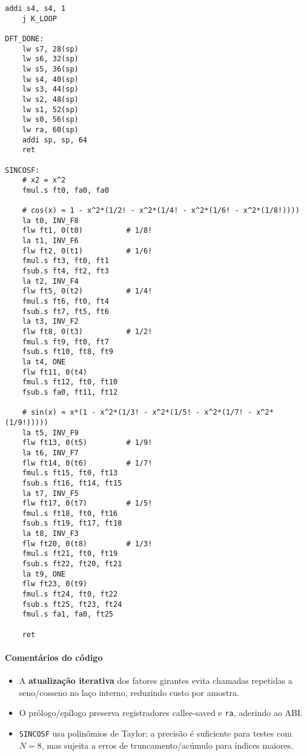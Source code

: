 \documentclass[12pt,a4paper]{article}
\begin{document}
\begin{lstlisting}[language=Assembly, caption={DFT (3.2.asm) com atualização iterativa e SINCOSF}]
    addi s4, s4, 1
    j K_LOOP

DFT_DONE:
    lw s7, 28(sp)
    lw s6, 32(sp)
    lw s5, 36(sp)
    lw s4, 40(sp)
    lw s3, 44(sp)
    lw s2, 48(sp)
    lw s1, 52(sp)
    lw s0, 56(sp)
    lw ra, 60(sp)
    addi sp, sp, 64
    ret
 
SINCOSF:
    # x2 = x^2
    fmul.s ft0, fa0, fa0

    # cos(x) ≈ 1 - x^2*(1/2! - x^2*(1/4! - x^2*(1/6! - x^2*(1/8!))))
    la t0, INV_F8
    flw ft1, 0(t0)          # 1/8!
    la t1, INV_F6
    flw ft2, 0(t1)          # 1/6!
    fmul.s ft3, ft0, ft1
    fsub.s ft4, ft2, ft3
    la t2, INV_F4
    flw ft5, 0(t2)          # 1/4!
    fmul.s ft6, ft0, ft4
    fsub.s ft7, ft5, ft6
    la t3, INV_F2
    flw ft8, 0(t3)          # 1/2!
    fmul.s ft9, ft0, ft7
    fsub.s ft10, ft8, ft9
    la t4, ONE
    flw ft11, 0(t4)
    fmul.s ft12, ft0, ft10
    fsub.s fa0, ft11, ft12

    # sin(x) ≈ x*(1 - x^2*(1/3! - x^2*(1/5! - x^2*(1/7! - x^2*(1/9!)))))
    la t5, INV_F9
    flw ft13, 0(t5)         # 1/9!
    la t6, INV_F7
    flw ft14, 0(t6)         # 1/7!
    fmul.s ft15, ft0, ft13
    fsub.s ft16, ft14, ft15
    la t7, INV_F5
    flw ft17, 0(t7)         # 1/5!
    fmul.s ft18, ft0, ft16
    fsub.s ft19, ft17, ft18
    la t8, INV_F3
    flw ft20, 0(t8)         # 1/3!
    fmul.s ft21, ft0, ft19
    fsub.s ft22, ft20, ft21
    la t9, ONE
    flw ft23, 0(t9)
    fmul.s ft24, ft0, ft22
    fsub.s ft25, ft23, ft24
    fmul.s fa1, fa0, ft25

    ret
\end{lstlisting}

\paragraph{Comentários do código}
\begin{itemize}
  \item A \textbf{atualização iterativa} dos fatores girantes evita chamadas repetidas a seno/cosseno no laço interno, reduzindo custo por amostra.
  \item O prólogo/epílogo preserva registradores callee-saved e \texttt{ra}, aderindo ao ABI.
  \item \texttt{SINCOSF} usa polinômios de Taylor; a precisão é suficiente para testes com $N=8$, mas sujeita a erros de truncamento/acúmulo para índices maiores.
\end{itemize}
\end{document}

